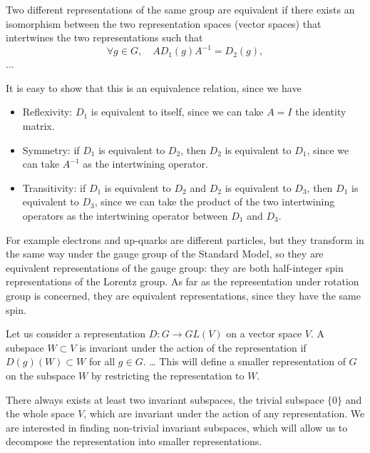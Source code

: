 \begin{definition}
    Two different representations of the same group are equivalent if there exists an isomorphism between the two representation spaces (vector spaces) that intertwines the two representations such that
    \[
        \forall g \in G, \quad A D_1(g) A^{-1} = D_2(g),
    \]
    ...
\end{definition}

It is easy to show that this is an equivalence relation, since we have
\begin{itemize}
    \item Reflexivity: \(D_1\) is equivalent to itself, since we can take \(A = I\) the identity matrix.
    \item Symmetry: if \(D_1\) is equivalent to \(D_2\), then \(D_2\) is equivalent to \(D_1\), since we can take \(A^{-1}\) as the intertwining operator.
    \item Transitivity: if \(D_1\) is equivalent to \(D_2\) and \(D_2\) is equivalent to \(D_3\), then \(D_1\) is equivalent to \(D_3\), since we can take the product of the two intertwining operators as the intertwining operator between \(D_1\) and \(D_3\).
\end{itemize}

\begin{example}
    For example electrons and up-quarks are different particles, but they transform in the same way under the gauge group of the Standard Model, so they are equivalent representations of the gauge group: they are both half-integer spin representations of the Lorentz group. As far as the representation under rotation group is concerned, they are equivalent representations, since they have the same spin.
\end{example}

\begin{definition}
    Let us consider a representation \(D : G \to GL(V)\) on a vector space \(V\). A subspace \(W \subset V\) is invariant under the action of the representation if \(D(g)(W) \subset W\) for all \(g \in G\).
    \dots
    This will define a smaller representation of \(G\) on the subspace \(W\) by restricting the representation to \(W\).
\end{definition}

There always exists at least two invariant subspaces, the trivial subspace \(\{0\}\) and the whole space \(V\), which are invariant under the action of any representation. We are interested in finding non-trivial invariant subspaces, which will allow us to decompose the representation into smaller representations.

